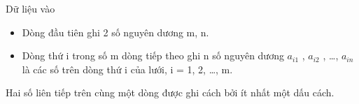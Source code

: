 Dữ liệu vào
\begin{itemize}
	\item     Dòng đầu tiên ghi 2 số nguyên dương m, n.   
	\item     Dòng thứ i trong số m dòng tiếp theo ghi n số nguyên dương $a_{i1}$    , $a_{i2}$    , …, $a_{in}$    là các số trên dòng thứ i của lưới, i = 1, 2, …, m.   
\end{itemize}

   Hai số liên tiếp trên cùng một dòng được ghi cách bởi ít nhất một dấu cách.